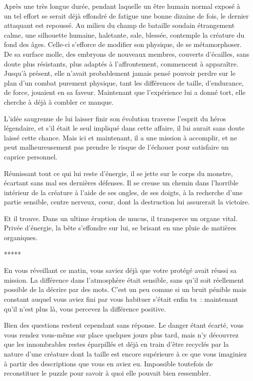 \documentclass{report}
\newcommand{\ellipse}{
    \begin{center}
        *****
    \end{center}
}
\begin{document}
Après une très longue durée, pendant laquelle un être humain normal exposé à un tel effort se serait déjà effondré de fatigue une bonne dizaine de fois, le dernier attaquant est repoussé. Au milieu du champ de bataille soudain étrangement calme, une silhouette humaine, haletante, sale, blessée, contemple la créature du fond des âges. Celle-ci s'efforce de modifier son physique, de se métamorphoser. De sa surface molle, des embryons de nouveaux membres, couverts d'écailles, sans doute plus résistants, plus adaptés à l'affrontement, commencent à apparaître. Jusqu'à présent, elle n'avait probablement jamais pensé pouvoir perdre sur le plan d'un combat purement physique, tant les différences de taille, d'endurance, de force, jouaient en sa faveur. Maintenant que l'expérience lui a donné tort, elle cherche à déjà à combler ce manque.

L'idée saugrenue de lui laisser finir son évolution traverse l'esprit du héros légendaire, et s'il était le seul impliqué dans cette affaire, il lui aurait sans doute laissé cette chance. Mais ici et maintenant, il a une mission à accomplir, et ne peut malheureusement pas prendre le risque de l'échouer pour satisfaire un caprice personnel.

Réunissant tout ce qui lui reste d'énergie, il se jette sur le corps du monstre, écartant sans mal ses dernières défenses. Il se creuse un chemin dans l'horrible intérieur de la créature à l'aide de ses ongles, de ses doigts, à la recherche d'une partie sensible, centre nerveux, cœur, dont la destruction lui assurerait la victoire.

Et il trouve. Dans un ultime éruption de mucus, il transperce un organe vital. Privée d'énergie, la bête s'effondre sur lui, se brisant en une pluie de matières organiques.

\ellipse

En vous réveillant ce matin, vous saviez déjà que votre protégé avait réussi sa mission. La différence dans l'atmosphère était sensible, sans qu'il soit réellement possible de la décrire par des mots. C'est un peu comme si un bruit pénible mais constant auquel vous aviez fini par vous habituer s'était enfin tu : maintenant qu'il n'est plus là, vous percevez la différence positive.

Bien des questions restent cependant sans réponse. Le danger étant écarté, vous vous rendez vous-même sur place quelques jours plus tard, mais n'y découvrez que les innombrables restes éparpillés et déjà en train d'être recyclés par la nature d'une créature dont la taille est encore supérieure à ce que vous imaginiez à partir des descriptions que vous en aviez eu. Impossible toutefois de reconstituer le puzzle pour savoir à quoi elle pouvait bien ressembler.
\end{document}
